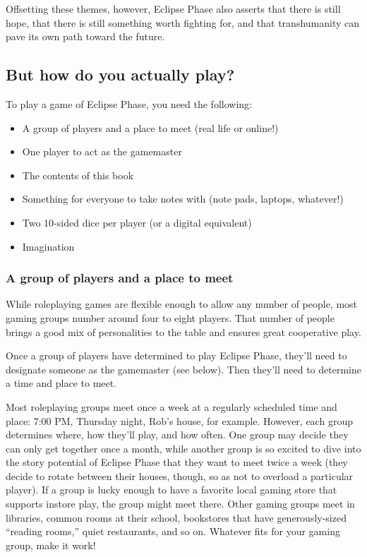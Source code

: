 Offsetting these themes, however, Eclipse Phase also asserts that there is still hope, that there is still something worth fighting for, and that transhumanity can pave its own path toward the future.


\subsection{But how do you actually play?}
\label{sec:but-how-do}

To play a game of Eclipse Phase, you need the following:

\begin{itemize}
\item A group of players and a place to meet (real life or online!) 
\item One player to act as the gamemaster 
\item The contents of this book 
\item Something for everyone to take notes with (note pads, laptops,  whatever!) 
\item Two 10-sided dice per player (or a digital equivalent) 
\item Imagination 
\end{itemize}

\subsubsection{A group of players and a place to meet}
\label{sec:group-players}

While roleplaying games are flexible enough to allow any number of people, most gaming groups number around four to eight players. That number of people brings a good mix of personalities to the table and ensures great cooperative play.

Once a group of players have determined to play Eclipse Phase, they'll need to designate someone as the gamemaster (see below). Then they'll need to determine a time and place to meet.

Most roleplaying groups meet once a week at a regularly scheduled time and place: 7:00 PM, Thursday night, Rob's house, for example. However, each group determines where, how they'll play, and how often. One group may decide they can only get together once a month, while another group is so excited to dive into the story potential of Eclipse Phase that they want to meet twice a week (they decide to rotate between their houses, though, so as not to overload a particular player). If a group is lucky enough to have a favorite local gaming store that supports instore play, the group might meet there. Other gaming groups meet in libraries, common rooms at their school, bookstores that have generously-sized ``reading rooms,'' quiet restaurants, and so on. Whatever fits for your gaming group, make it work!

